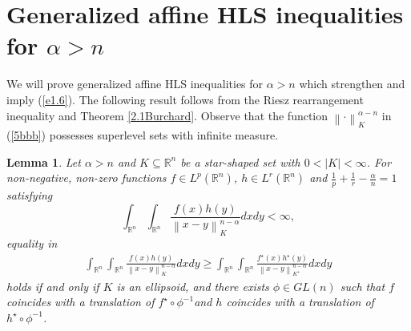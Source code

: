 \documentclass[preprint,12pt]{elsarticle}
\newtheorem{lem}{Lemma}
\begin{document}
\section{Generalized affine HLS inequalities for $\alpha > n$}\label{5}
 We will prove generalized affine HLS inequalities for $\alpha > n$ which strengthen and imply (\ref{e1.6}). The following result follows from the Riesz rearrangement inequality and Theorem \ref{2.1Burchard}. Observe that the function $\left\|\cdot\right\|_{K}^{\alpha-n}$ in (\ref{5bbb}) possesses superlevel sets with infinite measure.
\begin{lem}\label{5a}
Let $\alpha > n$ and $ K\subseteq \mathbb{R}^n $ be a star-shaped set with $0< \left | K \right | < \infty $. For non-negative, non-zero functions $f\in L^{p}\left ( \mathbb{R}^n  \right )$, $h\in L^{r}\left ( \mathbb{R}^n  \right )$ and $\frac{1}{p}+\frac{1}{r}-\frac{\alpha }{n}=1$ satisfying
\begin{equation}
	\int_{\mathbb{R}^n}\int_{\mathbb{R}^n}\frac{f\left ( x \right )h\left ( y \right )  }{\left \| x-y \right \|^{n-\alpha } _{K} }dxdy  < \infty ,\label{5bbb}
\end{equation}
equality in 
\begin{eqnarray}
	\int_{\mathbb{R}^n}\int_{\mathbb{R}^n}\frac{f\left ( x \right )h\left ( y \right )  }{\left \| x-y \right \|^{n-\alpha } _{K}  }dxdy\ge\int_{\mathbb{R}^n}\int_{\mathbb{R}^n}\frac{f^{\star } \left ( x \right )h^{\star } \left ( y \right )  }{\left \| x-y \right \|^{n-\alpha } _{K^{\star } }  }dxdy\label{5cc}
\end{eqnarray}
holds if and only if $K$ is an ellipsoid, and there exists $\phi \in GL(n)$ such that $f$ coincides with a translation of $ f^{\star }\circ \phi^{-1} $and $h$  coincides with a translation of $h^{\star }\circ \phi^{-1}$.  
\end{lem}
\end{document}
